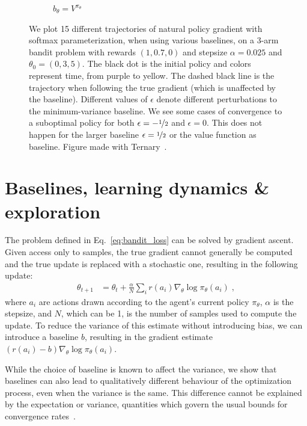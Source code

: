 \begin{figure}[t]
\begin{subfigure}[b]{0.24\linewidth}
    \caption{$b_\theta=V^{\pi_\theta}$}
    \label{fig:v}
  \end{subfigure}
  \caption{ \label{fig:trajectories}  We plot 15 different trajectories of natural policy gradient with softmax parameterization, when using various baselines, on a 3-arm bandit problem with rewards $(1,0.7,0)$ and stepsize $\alpha = 0.025$ and $\theta_0 = (0, 3, 5)$. The black dot is the initial policy and colors represent time, from purple to yellow. The dashed black line is the trajectory when following the true gradient (which is unaffected by the baseline). Different values of $\epsilon$ denote different perturbations to the minimum-variance baseline. We see some cases of convergence to a suboptimal policy for both $\epsilon = -\nicefrac{1}{2}$ and $\epsilon = 0$. This does not happen for the larger baseline $\epsilon = \nicefrac{1}{2}$ or the value function as baseline. Figure made with Ternary~\citep{pythonternary}.}
\end{figure}



\section{Baselines, learning dynamics \& exploration}
\label{sec:committal}

The problem defined in Eq.~\ref{eq:bandit_loss} can be solved by gradient ascent. Given access only to samples, the true gradient cannot generally be computed and the true update is replaced with a stochastic one, resulting in the following update:
\begin{align}
    \theta_{t+1} &= \theta_t + \frac{\alpha}{N} \sum_i r(a_i) \nabla_\theta \log \pi_\theta(a_i) \label{eq:mc_update} \; ,
\end{align}
where $a_i$ are actions drawn according to the agent's current policy $\pi_\theta$, $\alpha$ is the stepsize, and $N$, which can be 1, is the number of samples used to compute the update.
To reduce the variance of this estimate without introducing bias, we can introduce a baseline $b$, resulting in the gradient estimate $(r(a_i) - b) \nabla_\theta \log \pi_\theta(a_i)$.


While the choice of baseline is known to affect the variance, we show that baselines can also lead to qualitatively different behaviour of the optimization process, even when the variance is the same. This difference cannot be explained by the expectation or variance, quantities which govern the usual bounds for convergence rates~\citep{bottou2018optimization}. 


